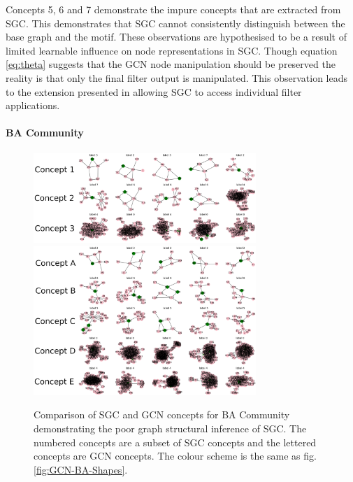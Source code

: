 Concepts 5, 6 and 7 demonstrate the impure concepts that are extracted from SGC.
This demonstrates that SGC cannot consistently distinguish between the base graph and the motif.
These observations are hypothesised to be a result of limited learnable influence on node representations in SGC.
Though equation \ref{eq:theta} suggests that the GCN node manipulation should be preserved the reality is that only the final filter output is manipulated.
This observation leads to the extension presented in  allowing SGC to access individual filter applications.

\paragraph{BA Community}
\begin{figure}
    \centering
    \includegraphics[width=0.75\textwidth]{figures/SGC-BA-Community}
    \includegraphics[width=0.75\textwidth]{figures/GCN-BA-Community}
    \caption{Comparison of SGC and GCN concepts for BA Community demonstrating the poor graph structural inference of SGC. The numbered concepts are a subset of SGC concepts and the lettered concepts are GCN concepts. The colour scheme is the same as fig. \ref{fig:GCN-BA-Shapes}.}
    \label{fig:BA-Community}
\end{figure}

